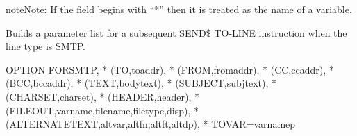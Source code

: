 \documentclass[letterpaper,10pt,english]{sphinxmanual}
\begin{document}
\begin{sphinxadmonition}{note}{Note:}
If the field begins with “*” then it is treated as the name of a variable.
\end{sphinxadmonition}


Builds a parameter list for a subsequent SEND\$ TO-LINE instruction when the line type is SMTP.

\begin{sphinxVerbatim}[commandchars=\\\{\}]
OPTION\PYGZdl{} FOR\PYGZhy{}SMTP,                                       *
    (TO,\PYGZsq{}toaddr\PYGZsq{}),                                      *
    (FROM,\PYGZsq{}fromaddr\PYGZsq{}),                                  *
    (CC,\PYGZsq{}ccaddr\PYGZsq{}),                                      *
    (BCC,\PYGZsq{}bccaddr\PYGZsq{}),                                    *
    (TEXT,\PYGZsq{}bodytext\PYGZsq{}),                                  *
    (SUBJECT,\PYGZsq{}subjtext\PYGZsq{}),                               *
    (CHARSET,\PYGZsq{}charset\PYGZsq{}),                                *
    (HEADER,\PYGZsq{}header\PYGZsq{}),                                  *
    (FILE\PYGZhy{}OUT,\PYGZsq{}varname\PYGZsq{},\PYGZsq{}filename\PYGZsq{},\PYGZsq{}filetype\PYGZsq{},\PYGZsq{}disp\PYGZsq{}),  *
    (ALTERNATE\PYGZhy{}TEXT,\PYGZsq{}altvar\PYGZsq{},\PYGZsq{}altfn\PYGZsq{},\PYGZsq{}altft\PYGZsq{},\PYGZsq{}altdp\PYGZsq{}),  *
    TOVAR=\PYGZsq{}varnamep\PYGZsq{}
\end{sphinxVerbatim}
\end{document}
